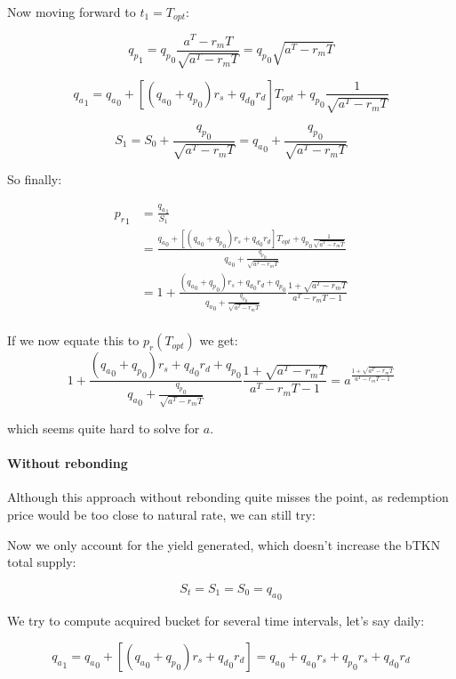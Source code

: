 \documentclass{article}
\begin{document}
Now moving forward to $t_1 = T_{opt}$:

\[
{q_p}_1 = {q_p}_0 \frac{a^T -r_mT}{\sqrt{a^T -r_mT}} = {q_p}_0 \sqrt{a^T - r_mT}
\]

\[
{q_a}_1 = {q_a}_0 + [({q_a}_0 + {q_p}_0)r_s + {q_d}_0 r_d] T_{opt} + {q_p}_0 \frac{1}{\sqrt{a^T - r_mT}}
\]

\[
S_1 = S_0 + \frac{{q_p}_0}{\sqrt{a^T - r_mT}} = {q_a}_0 + \frac{{q_p}_0}{\sqrt{a^T - r_mT}}
\]

So finally:

\begin{equation}
  \label{eq:conservative_p_r_1}
  \begin{split}
    {p_r}_1 & = \frac{{q_a}_1}{S_1} \\
    & = \frac{{q_a}_0 + [({q_a}_0 + {q_p}_0)r_s + {q_d}_0 r_d] T_{opt} + {q_p}_0 \frac{1}{\sqrt{a^T - r_mT}}}{{q_a}_0 + \frac{{q_p}_0}{\sqrt{a^T - r_mT}}} \\
    & = 1 + \frac{({q_a}_0 + {q_p}_0)r_s + {q_d}_0 r_d + {q_p}_0}{{q_a}_0 + \frac{{q_p}_0}{\sqrt{a^T - r_mT}}} \frac{1+ \sqrt{a^T - r_mT}}{a^T - r_mT - 1} \\
  \end{split}
\end{equation}

If we now equate this to $p_r(T_{opt})$ we get:
\begin{equation}
  \label{}
1 + \frac{({q_a}_0 + {q_p}_0)r_s + {q_d}_0 r_d + {q_p}_0}{{q_a}_0 + \frac{{q_p}_0}{\sqrt{a^T - r_mT}}} \frac{1+ \sqrt{a^T - r_mT}}{a^T - r_mT - 1} = a ^{\frac{1+ \sqrt{a^T - r_mT}}{a^T - r_mT - 1}}
\end{equation}

which seems quite hard to solve for $a$.

\paragraph{Without rebonding}

Although this approach without rebonding quite misses the point, as redemption price would be too close to natural rate, we can still try:

Now we only account for the yield generated, which doesn’t increase the bTKN total supply:

\[
S_t = S_1 = S_0 = {q_a}_0
\]

We try to compute acquired bucket for several time intervals, let’s say daily:

\[
{q_a}_1 = {q_a}_0 + [({q_a}_0 + {q_p}_0) r_s + {q_d}_0 r_d] = {q_a}_0 + {q_a}_0 r_s + {q_p}_0 r_s + {q_d}_0 r_d
\]
\end{document}
